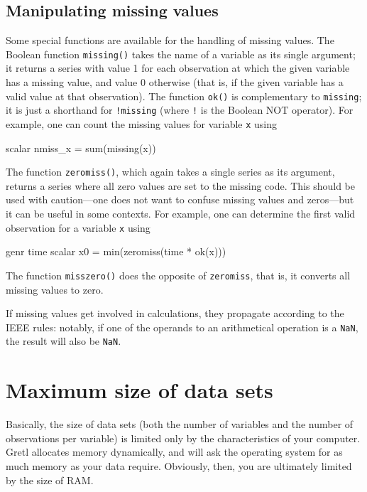 \subsection{Manipulating missing values}
\label{sec:genr-missing}

Some special functions are available for the handling of missing
values.  The Boolean function \verb+missing()+ takes the name of a
variable as its single argument; it returns a series with value 1 for
each observation at which the given variable has a missing value, and
value 0 otherwise (that is, if the given variable has a valid value at
that observation).  The function \verb+ok()+ is complementary to
\verb+missing+; it is just a shorthand for \verb+!missing+ (where
\verb+!+ is the Boolean NOT operator).  For example, one can count the
missing values for variable \verb+x+ using

\begin{code}
scalar nmiss_x = sum(missing(x))
\end{code}

The function \verb+zeromiss()+, which again takes a single series as
its argument, returns a series where all zero values are set to the
missing code.  This should be used with caution---one does not want to
confuse missing values and zeros---but it can be useful in some
contexts.  For example, one can determine the first valid observation
for a variable \verb+x+ using

\begin{code}
genr time
scalar x0 = min(zeromiss(time * ok(x)))
\end{code}

The function \verb+misszero()+ does the opposite of \verb+zeromiss+,
that is, it converts all missing values to zero.

If missing values get involved in calculations, they propagate
according to the IEEE rules: notably, if one of the operands to an
arithmetical operation is a \texttt{NaN}, the result will also be
\texttt{NaN}.
    
\section{Maximum size of data sets}
\label{data-limits}

Basically, the size of data sets (both the number of variables and the
number of observations per variable) is limited only by the
characteristics of your computer.  Gretl allocates memory
dynamically, and will ask the operating system for as much memory as
your data require.  Obviously, then, you are ultimately limited by the
size of RAM.

